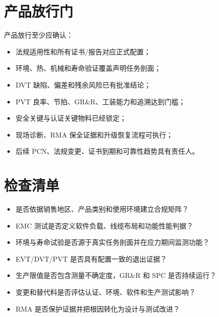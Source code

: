 \section{产品放行门}

产品放行至少应确认：
\begin{itemize}
  \item 法规适用性和所有证书/报告对应正式配置；
  \item 环境、热、机械和寿命验证覆盖声明任务剖面；
  \item DVT 缺陷、偏差和残余风险已有批准结论；
  \item PVT 良率、节拍、GR\&R、工装能力和追溯达到门槛；
  \item 安全关键与认证关键物料已经锁定；
  \item 现场诊断、RMA 保全证据和升级恢复流程可执行；
  \item 后续 PCN、法规变更、证书到期和可靠性趋势具有责任人。
\end{itemize}

\section{检查清单}

\begin{itemize}
  \item 是否依据销售地区、产品类别和使用环境建立合规矩阵？
  \item EMC 测试是否定义软件负载、线缆布局和功能性能判据？
  \item 环境与寿命试验是否源于真实任务剖面并在应力期间监测功能？
  \item EVT/DVT/PVT 是否具有配置一致的退出证据？
  \item 生产限值是否包含测量不确定度，GR\&R 和 SPC 是否持续运行？
  \item 变更和替代料是否评估认证、环境、软件和生产测试影响？
  \item RMA 是否保护证据并把根因转化为设计与测试改进？
\end{itemize}
